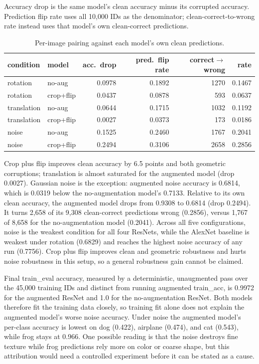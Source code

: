 \documentclass[11pt,a4paper]{article}
\begin{document}
Accuracy drop is the same model's clean accuracy minus its corrupted
accuracy. Prediction flip rate uses all 10,000 IDs as the denominator;
clean-correct-to-wrong rate instead uses that model's own clean-correct
predictions.

\begin{table}[H]
\centering
\footnotesize
\setlength{\tabcolsep}{3pt}
\begin{tabular}{@{}llrrrr@{}}
\toprule
\textbf{condition} & \textbf{model} & \textbf{acc.\ drop} & \textbf{pred.\ flip rate} & \textbf{correct$\to$wrong} & \textbf{rate} \\
\midrule
rotation & no-aug & 0.0978 & 0.1892 & 1270 & 0.1467 \\
rotation & crop+flip & 0.0437 & 0.0878 & 593 & 0.0637 \\
translation & no-aug & 0.0644 & 0.1715 & 1032 & 0.1192 \\
translation & crop+flip & 0.0027 & 0.0373 & 173 & 0.0186 \\
noise & no-aug & 0.1525 & 0.2460 & 1767 & 0.2041 \\
noise & crop+flip & 0.2494 & 0.3106 & 2658 & 0.2856 \\
\bottomrule
\end{tabular}
\caption{Per-image pairing against each model's own clean predictions.}
\label{tab:t4-paired}
\end{table}

Crop plus flip improves clean accuracy by 6.5 points and both geometric
corruptions; translation is almost saturated for the augmented model (drop
0.0027). Gaussian noise is the exception: augmented noise accuracy is
0.6814, which is 0.0319 below the no-augmentation model's 0.7133. Relative
to its own clean accuracy, the augmented model drops from 0.9308 to 0.6814
(drop 0.2494). It turns 2,658 of its 9,308 clean-correct predictions wrong
(0.2856), versus 1,767 of 8,658 for the no-augmentation model (0.2041).
Across all five configurations, noise is the weakest condition for all four
ResNets, while the AlexNet baseline is weakest under rotation (0.6829) and
reaches the highest noise accuracy of any run (0.7756). Crop plus flip
improves clean and geometric robustness and hurts noise robustness in this
setup, so a general robustness gain cannot be claimed.

Final train\_eval accuracy, measured by a deterministic, unaugmented pass
over the 45,000 training IDs and distinct from running augmented
train\_acc, is 0.9972 for the augmented ResNet and 1.0 for the
no-augmentation ResNet. Both models therefore fit the training data closely,
so training fit alone does not explain the augmented model's worse noise
accuracy. Under noise the augmented model's per-class accuracy is lowest on
dog (0.422), airplane (0.474), and cat (0.543), while frog stays at 0.966.
One possible reading is that the noise destroys fine texture while frog
predictions rely more on color or coarse shape, but this attribution would
need a controlled experiment before it can be stated as a cause.
\end{document}
